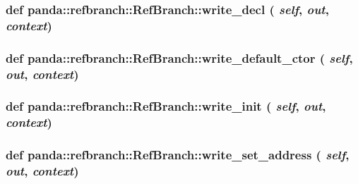 \label{classpanda_1_1refbranch_1_1RefBranch_a4ad1688aa5e4f87146a3db6bd6999c3b}
\hypertarget{classpanda_1_1refbranch_1_1RefBranch_a69bfcd1c3fddf2fc5c77408316fa02db}{
\subsubsection[{write\_\-decl}]{\setlength{\rightskip}{0pt plus 5cm}def panda::refbranch::RefBranch::write\_\-decl ( {\em self}, \/   {\em out}, \/   {\em context})}}
\label{classpanda_1_1refbranch_1_1RefBranch_a69bfcd1c3fddf2fc5c77408316fa02db}
\hypertarget{classpanda_1_1refbranch_1_1RefBranch_a529308f5dbe8e68455b3df4d348b761f}{
\subsubsection[{write\_\-default\_\-ctor}]{\setlength{\rightskip}{0pt plus 5cm}def panda::refbranch::RefBranch::write\_\-default\_\-ctor ( {\em self}, \/   {\em out}, \/   {\em context})}}
\label{classpanda_1_1refbranch_1_1RefBranch_a529308f5dbe8e68455b3df4d348b761f}
\hypertarget{classpanda_1_1refbranch_1_1RefBranch_a6d8cb2e71133af0cc0538f7d157a19a1}{
\subsubsection[{write\_\-init}]{\setlength{\rightskip}{0pt plus 5cm}def panda::refbranch::RefBranch::write\_\-init ( {\em self}, \/   {\em out}, \/   {\em context})}}
\label{classpanda_1_1refbranch_1_1RefBranch_a6d8cb2e71133af0cc0538f7d157a19a1}
\hypertarget{classpanda_1_1refbranch_1_1RefBranch_a15316c66747e9d6d033de65ecc904ff3}{
\subsubsection[{write\_\-set\_\-address}]{\setlength{\rightskip}{0pt plus 5cm}def panda::refbranch::RefBranch::write\_\-set\_\-address ( {\em self}, \/   {\em out}, \/   {\em context})}}

